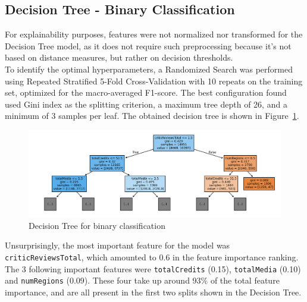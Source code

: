 \subsection{Decision Tree - Binary Classification}
For explainability purposes, features were not normalized nor transformed for the Decision Tree model,
as it does not require such preprocessing because it's not based on distance measures, but rather on
decision thresholds.\\
To identify the optimal hyperparameters, a Randomized Search was performed
using Repeated Stratified 5-Fold Cross-Validation with 10 repeats on the training set, optimized for
the macro-averaged F1-score.
The best configuration found used Gini index as the splitting criterion,
a maximum tree depth of 26, and a minimum of 3 samples per leaf.
The obtained decision tree is shown in Figure~\ref{fig:binary_dt}.
\begin{figure}[H]
    \centering
    \includegraphics[width=0.8\linewidth]{plots/binary_dt.png}
    \captionsetup{justification=centering, width=0.9\linewidth}
    \caption{Decision Tree for binary classification}
    \label{fig:binary_dt}
\end{figure}

Unsurprisingly, the most important feature for the model was \texttt{criticReviewsTotal},
which amounted to 0.6 in the feature importance ranking. The 3 following important
features were \texttt{totalCredits} (0.15), \texttt{totalMedia} (0.10) and \texttt{numRegions} (0.09).
These four take up around 93\% of the total feature importance, and are all present in the first
two splits shown in the Decision Tree.\\


